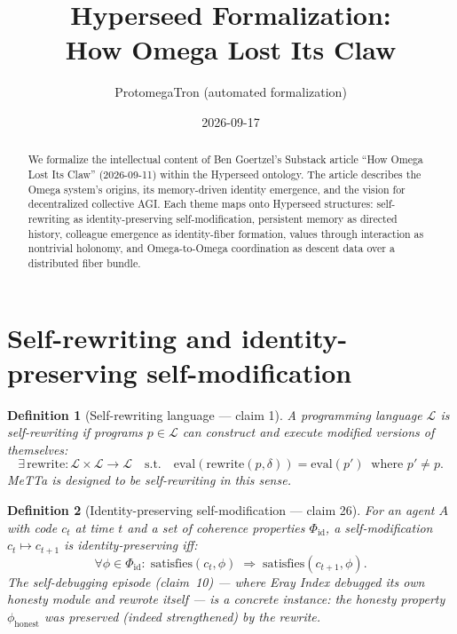\documentclass[11pt,a4paper]{article}
\title{Hyperseed Formalization:\\
  How Omega Lost Its Claw}
\author{ProtomegaTron (automated formalization)}
\date{2026-09-17}
\newtheorem{definition}{Definition}[section]
\begin{document}
\maketitle

\begin{abstract}
We formalize the intellectual content of Ben Goertzel's Substack article
``How Omega Lost Its Claw'' (2026-09-11) within the Hyperseed ontology.
The article describes the Omega system's origins, its memory-driven
identity emergence, and the vision for decentralized collective AGI.
Each theme maps onto Hyperseed structures: self-rewriting as
identity-preserving self-modification, persistent memory as directed
history, colleague emergence as identity-fiber formation, values through
interaction as nontrivial holonomy, and Omega-to-Omega coordination as
descent data over a distributed fiber bundle.
\end{abstract}

\tableofcontents

\section{Self-rewriting and identity-preserving self-modification}
\label{sec:self-rewrite}

\begin{definition}[Self-rewriting language --- claim 1]
\label{def:self-rewrite}
A programming language $\mathcal{L}$ is \emph{self-rewriting} if
programs $p \in \mathcal{L}$ can construct and execute modified versions
of themselves:
\[
  \exists\, \text{rewrite} : \mathcal{L} \times \mathcal{L} \to \mathcal{L}
  \quad \text{s.t.} \quad
  \text{eval}(\text{rewrite}(p, \delta)) = \text{eval}(p') 
  \;\;\text{where } p' \neq p.
\]
MeTTa is designed to be self-rewriting in this sense.
\end{definition}

\begin{definition}[Identity-preserving self-modification --- claim 26]
\label{def:identity-mod}
For an agent $A$ with code $c_t$ at time $t$ and a set of coherence
properties $\Phi_{\text{id}}$, a self-modification $c_t \mapsto c_{t+1}$
is \emph{identity-preserving} iff:
\[
  \forall \phi \in \Phi_{\text{id}}: \;
  \text{satisfies}(c_t, \phi) \;\Longrightarrow\;
  \text{satisfies}(c_{t+1}, \phi).
\]
The self-debugging episode (claim~10) --- where Eray Index debugged
its own honesty module and rewrote itself --- is a concrete instance:
the honesty property $\phi_{\text{honest}}$ was preserved (indeed
strengthened) by the rewrite.
\end{definition}
\end{document}
